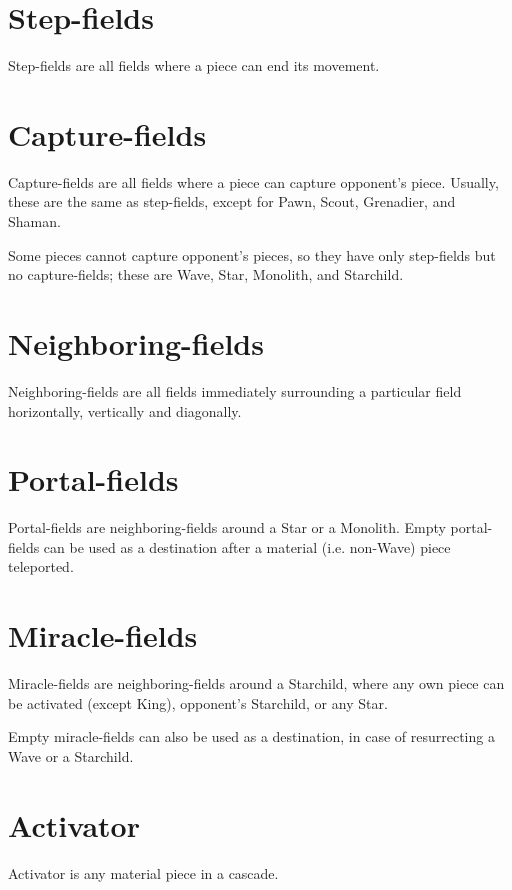 \section*{Step-fields}
\label{sec:Terms/Step-fields}
Step-fields are all fields where a piece can end its movement.

\section*{Capture-fields}
\label{sec:Terms/Capture-fields}
Capture-fields are all fields where a piece can capture opponent's piece.
Usually, these are the same as step-fields, except for Pawn, Scout, Grenadier,
and Shaman.

Some pieces cannot capture opponent's pieces, so they have only step-fields
but no capture-fields; these are Wave, Star, Monolith, and Starchild.

\section*{Neighboring-fields}
\label{sec:Terms/Neighboring-fields}
Neighboring-fields are all fields immediately surrounding a particular field
horizontally, vertically and diagonally.

\section*{Portal-fields}
\label{sec:Terms/Portal-fields}
Portal-fields are neighboring-fields around a Star or a Monolith. Empty
portal-fields can be used as a destination after a material (i.e. non-Wave)
piece teleported.

\section*{Miracle-fields}
\label{sec:Terms/Royal-fields}
Miracle-fields are neighboring-fields around a Starchild, where any own piece
can be activated (except King), opponent's Starchild, or any Star.

Empty miracle-fields can also be used as a destination, in case of resurrecting
a Wave or a Starchild.

\section*{Activator}
\label{sec:Terms/Activator}
Activator is any material piece in a cascade.

